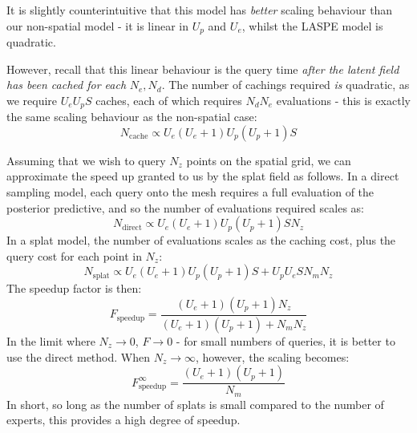         \begin{aside}
            It is slightly counterintuitive that this model has \textit{better} scaling behaviour than our non-spatial model - it is linear in $U_p$ and $U_e$, whilst the LASPE model is quadratic.

            However, recall that this linear behaviour is the query time \textit{after the latent field has been cached for each } $N_e, N_d$. The number of cachings required \textit{is} quadratic, as we require $U_e U_p S$ caches, each of which requires $N_d N_e$ evaluations - this is exactly the same scaling behaviour as the non-spatial case:
            \begin{equation}
                N_\text{cache} \propto {U_e(U_e+1) U_p (U_p + 1)} S
            \end{equation}

            Assuming that we wish to query $N_z$ points on the spatial grid, we can approximate the speed up granted to us by the splat field as follows. In a direct sampling model, each query onto the mesh requires a full evaluation of the posterior predictive, and so the number of evaluations required scales as:
            \begin{equation}
                N_\text{direct} \propto {U_e(U_e+1) U_p (U_p + 1)} S N_z
            \end{equation}
            In a splat model, the number of evaluations scales as the caching cost, plus the query cost for each point in $N_z$:
            \begin{equation}
                N_\text{splat} \propto {U_e(U_e+1) U_p (U_p + 1)} S + U_p U_e S N_m N_z
            \end{equation}
            The speedup factor is then:
            \begin{equation}
                F_\text{speedup} = \frac{(U_e+1)(U_p+1) N_z}{(U_e+1)(U_p+1)  + N_m N_z}
            \end{equation}
            In the limit where $N_z \to 0$, $F \to 0$ - for small numbers of queries, it is better to use the direct method. When $N_z \to \infty$, however, the scaling becomes:
            \begin{equation}
                F_\text{speedup}^\infty = \frac{(U_e+1)(U_p + 1)}{N_m}
            \end{equation}
            In short, so long as the number of splats is small compared to the number of experts, this provides a high degree of speedup.
        \end{aside}
           